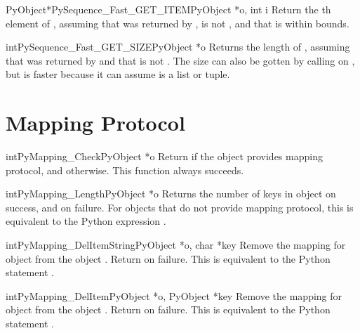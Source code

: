 \begin{cfuncdesc}{PyObject*}{PySequence_Fast_GET_ITEM}{PyObject *o, int i}
  Return the th element of , assuming that  was
  returned by ,  is not \NULL{},
  and that  is within bounds.
\end{cfuncdesc}

\begin{cfuncdesc}{int}{PySequence_Fast_GET_SIZE}{PyObject *o}
  Returns the length of , assuming that  was
  returned by  and that  is
  not \NULL{}.  The size can also be gotten by calling
   on , but
   is faster because it can
  assume  is a list or tuple.
\end{cfuncdesc}


\section{Mapping Protocol \label{mapping}}

\begin{cfuncdesc}{int}{PyMapping_Check}{PyObject *o}
  Return  if the object provides mapping protocol, and
   otherwise.  This function always succeeds.
\end{cfuncdesc}


\begin{cfuncdesc}{int}{PyMapping_Length}{PyObject *o}
  Returns the number of keys in object  on success, and
   on failure.  For objects that do not provide mapping
  protocol, this is equivalent to the Python expression
  .
\end{cfuncdesc}


\begin{cfuncdesc}{int}{PyMapping_DelItemString}{PyObject *o, char *key}
  Remove the mapping for object  from the object .
  Return  on failure.  This is equivalent to the Python
  statement .
\end{cfuncdesc}


\begin{cfuncdesc}{int}{PyMapping_DelItem}{PyObject *o, PyObject *key}
  Remove the mapping for object  from the object .
  Return  on failure.  This is equivalent to the Python
  statement .
\end{cfuncdesc}


